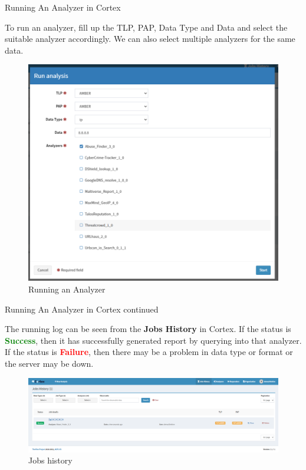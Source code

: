\begin{frame}{Running An Analyzer in Cortex}
\begin{justify}
    To run an analyzer, fill up the TLP, PAP, Data Type and Data and select the suitable analyzer accordingly. We can also select multiple analyzers for the same data.
\end{justify}

\begin{figure}[htp]
    \centering
    \includegraphics[scale = 0.35]{run-analyzer-cortex.png}
    \caption{Running an Analyzer}
    \label{fig:running-an-analyzer}
\end{figure}
    
\end{frame}

\begin{frame}{Running An Analyzer in Cortex continued}

\begin{justify}
    The running log can be seen from the \textbf{Jobs History} in Cortex. If the status is \textcolor{green}{\textbf{Success}}, then it has successfully generated report by querying into that analyzer. If the status is \textcolor{red}{\textbf{Failure}}, then there may be a problem in data type or format or the server may be down.
\end{justify}

\begin{figure}[htp]
    \centering
    \includegraphics[scale = 0.35]{run-analyzer-cortex-2.png}
    \caption{Jobs history}
    \label{fig:running-an-analyzer-2}
\end{figure}
    
\end{frame}

